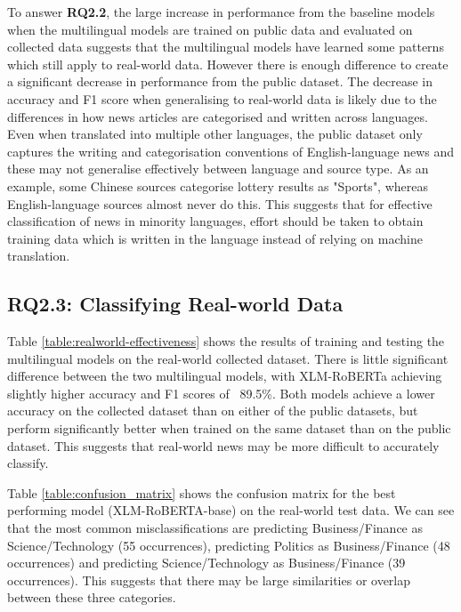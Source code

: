 \documentclass{l4proj}
\begin{document}
To answer \textbf{RQ2.2}, the large increase in performance from the baseline models when the multilingual models are trained on public data and evaluated on collected data suggests that the multilingual models have learned some patterns which still apply to real-world data. However there is enough difference to create a significant decrease in performance from the public dataset. The decrease in accuracy and F1 score when generalising to real-world data is likely due to the differences in how news articles are categorised and written across languages. Even when translated into multiple other languages, the public dataset only captures the writing and categorisation conventions of English-language news and these may not generalise effectively between language and source type. As an example, some Chinese sources categorise lottery results as "Sports", whereas English-language sources almost never do this. This suggests that for effective classification of news in minority languages, effort should be taken to obtain training data which is written in the language instead of relying on machine translation.

\subsection{RQ2.3: Classifying Real-world Data}
\label{section:rq2.3}
Table \ref{table:realworld-effectiveness} shows the results of training and testing the multilingual models on the real-world collected dataset. There is little significant difference between the two multilingual models, with XLM-RoBERTa achieving slightly higher accuracy and F1 scores of ~89.5\%. Both models achieve a lower accuracy on the collected dataset than on either of the public datasets, but perform significantly better when trained on the same dataset than on the public dataset. This suggests that real-world news may be more difficult to accurately classify. \par
Table \ref{table:confusion_matrix} shows the confusion matrix for the best performing model (XLM-RoBERTA-base) on the real-world test data. We can see that the most common misclassifications are predicting Business/Finance as Science/Technology (55 occurrences), predicting Politics as Business/Finance (48 occurrences) and predicting Science/Technology as Business/Finance (39 occurrences). This suggests that there may be large similarities or overlap between these three categories.
\end{document}
